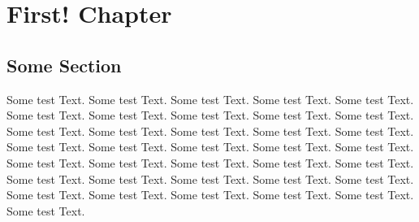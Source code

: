 \frontmatter
\emptydoublepage
\renewcommand{\thepage}{\Roman{page}}

\tableofcontents\emptydoublepage
\printglossary\emptydoublepage
\listoffigures\emptydoublepage
\listoftables\emptydoublepage
\lstlistoflistings\emptydoublepage

\mainmatter

\chapter{First! Chapter}
\section{Some Section}
Some test Text. Some test Text. Some test Text. Some test Text. Some test Text. Some test Text. Some test Text. Some test Text. Some test Text. Some test Text. Some test Text. Some test Text. Some test Text. Some test Text. Some test Text. Some test Text. Some test Text. Some test Text. Some test Text. Some test Text. Some test Text. Some test Text. Some test Text. Some test Text. Some test Text. Some test Text. Some test Text. Some test Text. Some test Text. Some test Text. Some test Text. Some test Text. Some test Text. Some test Text. Some test Text. Some test Text.


